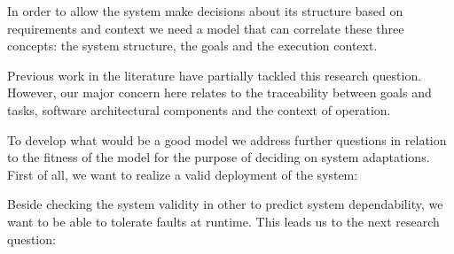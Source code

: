 

In order to allow the system make decisions about its structure based on requirements and context we need a model that can correlate these three concepts: the system structure, the goals and the execution context.



\setlength{\fboxsep}{10pt}
\noindent{}\bigskip

Previous work in the literature \cite{pessoa_dependable_2015} have partially tackled this research question. However, our major concern here relates to the traceability between goals and tasks, software architectural components and the context of operation.

To develop what would be a good model we address further questions in relation to the fitness of the model for the purpose of deciding on system adaptations. First of all, we want to realize a valid deployment of the system:

\setlength{\fboxsep}{10pt}
\noindent{}\bigskip

Beside checking the system validity in other to predict system dependability, we want to be able to tolerate faults at runtime. This leads us to the next research question:

\setlength{\fboxsep}{10pt}
\noindent{}\bigskip

